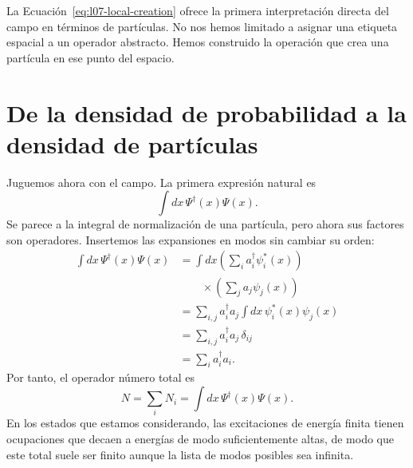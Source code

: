 La Ecuación~\eqref{eq:l07-local-creation} ofrece la primera interpretación directa del campo en términos de partículas. No nos hemos limitado a asignar una etiqueta espacial a un operador abstracto. Hemos construido la operación que crea una partícula en ese punto del espacio.

\begin{classroomqa}
\end{classroomqa}

\begin{classroomqa}
\end{classroomqa}

\section{De la densidad de probabilidad a la densidad de partículas}

Juguemos ahora con el campo. La primera expresión natural es
\begin{equation}
\int dx\,\Psi^\dagger(x)\Psi(x).
\end{equation}
Se parece a la integral de normalización de una partícula, pero ahora sus factores son operadores. Insertemos las expansiones en modos sin cambiar su orden:
\begin{align}
\int dx\,\Psi^\dagger(x)\Psi(x)
&=\int dx
\left(\sum_i a_i^\dagger\psi_i^*(x)\right)\\
&\qquad\times\left(\sum_j a_j\psi_j(x)\right) \\
&=\sum_{i,j}a_i^\dagger a_j
\int dx\,\psi_i^*(x)\psi_j(x) \\
&=\sum_{i,j}a_i^\dagger a_j\,\delta_{ij} \\
&=\sum_i a_i^\dagger a_i.
\label{eq:l07-number-derivation}
\end{align}
Por tanto, el operador número total es
\begin{equation}
N=\sum_i N_i
=\int dx\,\Psi^\dagger(x)\Psi(x).
\label{eq:l07-total-number}
\end{equation}
En los estados que estamos considerando, las excitaciones de energía finita tienen ocupaciones que decaen a energías de modo suficientemente altas, de modo que este total suele ser finito aunque la lista de modos posibles sea infinita.

